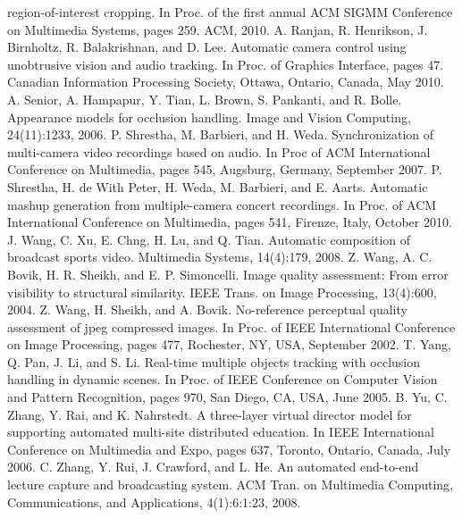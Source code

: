 \documentclass{new}
\begin{document}
\begin{thebibliography}{9}
region-of-interest cropping. In Proc. of the first annual ACM
SIGMM Conference on Multimedia Systems, pages 259.
ACM, 2010.
A. Ranjan, R. Henrikson, J. Birnholtz, R. Balakrishnan, and D. Lee. Automatic camera control using unobtrusive vision
and audio tracking. In Proc. of Graphics Interface, pages
47. Canadian Information Processing Society, Ottawa,
Ontario, Canada, May 2010.
A. Senior, A. Hampapur, Y. Tian, L. Brown, S. Pankanti, and R. Bolle. Appearance models for occlusion handling. Image
and Vision Computing, 24(11):1233, 2006.
P. Shrestha, M. Barbieri, and H. Weda. Synchronization of multi-camera video recordings based on audio. In Proc of
ACM International Conference on Multimedia, pages
545, Augsburg, Germany, September 2007.
P. Shrestha, H. de With Peter, H. Weda, M. Barbieri, and E. Aarts. Automatic mashup generation from multiple-camera concert recordings. In Proc. of ACM International Conference on Multimedia, pages 541, Firenze, Italy, October 2010.
J. Wang, C. Xu, E. Chng, H. Lu, and Q. Tian. Automatic
composition of broadcast sports video. Multimedia Systems,
14(4):179, 2008.
Z. Wang, A. C. Bovik, H. R. Sheikh, and E. P. Simoncelli. Image quality assessment: From error visibility to structural similarity. IEEE Trans. on Image Processing, 13(4):600,
2004.
Z. Wang, H. Sheikh, and A. Bovik. No-reference perceptual quality assessment of jpeg compressed images. In Proc. of IEEE International Conference on Image Processing, pages
477, Rochester, NY, USA, September 2002.
T. Yang, Q. Pan, J. Li, and S. Li. Real-time multiple objects tracking with occlusion handling in dynamic scenes. In Proc. of IEEE Conference on Computer Vision and Pattern Recognition, pages 970, San Diego, CA, USA, June 2005.
B. Yu, C. Zhang, Y. Rai, and K. Nahrstedt. A three-layer virtual director model for supporting automated multi-site distributed education. In IEEE International Conference on Multimedia and Expo, pages 637, Toronto, Ontario, Canada, July 2006.
C. Zhang, Y. Rui, J. Crawford, and L. He. An automated
end-to-end lecture capture and broadcasting system. ACM
Tran. on Multimedia Computing, Communications, and
Applications, 4(1):6:1:23, 2008.
\end{thebibliography}

%
\end{document}
